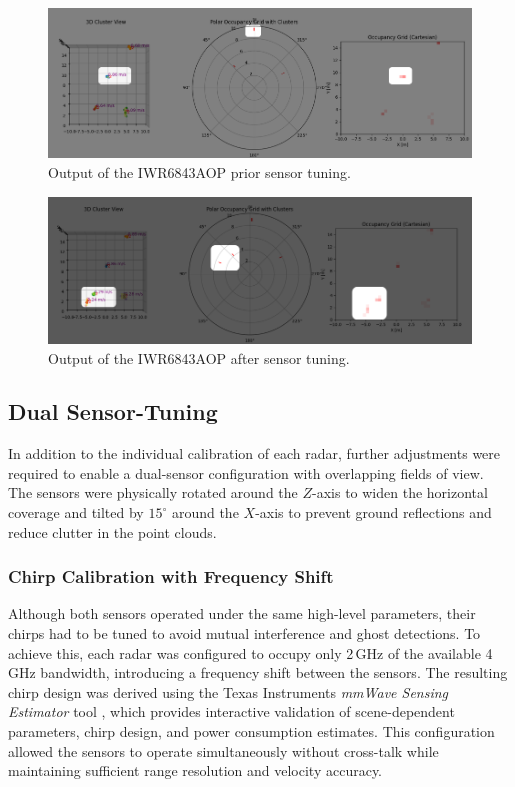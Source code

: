 \begin{figure}[!htbp]
    \centering
    \includegraphics[width=1.0\linewidth]{images/calib_ex.png}
    \caption{Output of the IWR6843AOP prior sensor tuning.}
    \label{fig:IWR6843AOP Calibration example for the sensor}
\end{figure}

\begin{figure}[!htbp]
    \centering
    \includegraphics[width=1.0\linewidth]{images/calib_ex2.png}
    \caption{Output of the IWR6843AOP after sensor tuning.}
    \label{fig:IWR6843AOP Calibration example2 for the sensor}
\end{figure}

\subsection{Dual Sensor-Tuning} 
In addition to the individual calibration of each radar, further adjustments were required to enable a dual-sensor configuration with overlapping fields of view. 
The sensors were physically rotated around the $Z$-axis to widen the horizontal coverage and tilted by $15^\circ$ around the $X$-axis to prevent ground reflections and reduce clutter in the point clouds. 

\subsubsection{Chirp Calibration with Frequency Shift} 
Although both sensors operated under the same high-level parameters, their chirps had to be tuned to avoid mutual interference and ghost detections. 
To achieve this, each radar was configured to occupy only 2\,GHz of the available 4\,GHz bandwidth, introducing a frequency shift between the sensors. 
The resulting chirp design was derived using the Texas Instruments \textit{mmWave Sensing Estimator} tool \cite{understanding_uart}, which provides interactive validation of scene-dependent parameters, chirp design, and power consumption estimates. 
This configuration allowed the sensors to operate simultaneously without cross-talk while maintaining sufficient range resolution and velocity accuracy. 

